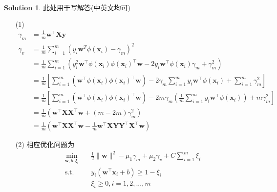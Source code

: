 \documentclass[a4paper,UTF8]{article}
\numberwithin{equation}{section}
\theoremstyle{definition}
\newtheorem*{solution}{Solution}
\def \X {\boldsymbol{X}}
\def \Y {\boldsymbol{Y}}
\def \w {\boldsymbol{w}}
\def \y {\boldsymbol{y}}
\def \x {\boldsymbol{x}}
\begin{document}
\begin{solution}
	此处用于写解答(中英文均可)
	\begin{enumerate}
        \item [(1)]
        \begin{align*}
            \gamma_m &= \frac1m \w^\top \X \y \\
            \gamma_v &= \frac1m \sum_{i=1}^m (y_i\w^T\phi(\x_i) - \gamma_m)^2 \\
                     &= \frac1m \sum_{i=1}^m \left( y_i^2 \w^\top\phi(\x_i)\phi(\x_i)^\top \w - 2y_i\w^\top\phi(\x_i) \gamma_m + \gamma_m^2 \right) \\
                     &= \frac1m \left[\sum_{i=1}^m \left( \w^\top\phi(\x_i)\phi(\x_i)^\top\w\right) - 2\gamma_m\sum_{i=1}^m y_i\w^\top \phi(\x_i) + \sum_{i=1}^m \gamma_m^2 \right] \\
                     &= \frac1m \left[\sum_{i=1}^m \left( \w^\top\phi(\x_i)\phi(\x_i)^\top\w\right) - 2m\gamma_m(\frac1m\sum_{i=1}^m y_i\w^\top \phi(\x_i)) + m \gamma_m^2 \right] \\
                     &= \frac1m \left( \w^\top\X\X^\top\w + (m-2m)\gamma_m^2 \right) \\
                     &= \frac1m \left( \w^\top\X\X^\top\w - \frac1m \w^\top \X \Y \Y^\top \X^\top \w \right)
        \end{align*}
        
        \item [(2)] 相应优化问题为
        \begin{align*}
            \min_{\w,b,\xi_i} & \quad \frac12\|\w\|^2 - \mu_1\gamma_m + \mu_2 \gamma_v + C\sum_{i=1}^{m} \xi_i  \\
            \text{s.t.} & \quad y_i(\w^\top\x_i+b) \geq 1-\xi_i \\
            & \quad \xi_i\geq 0, i=1,2,...,m \\
        \end{align*}
        

\end{enumerate}
\end{solution}
\end{document}
